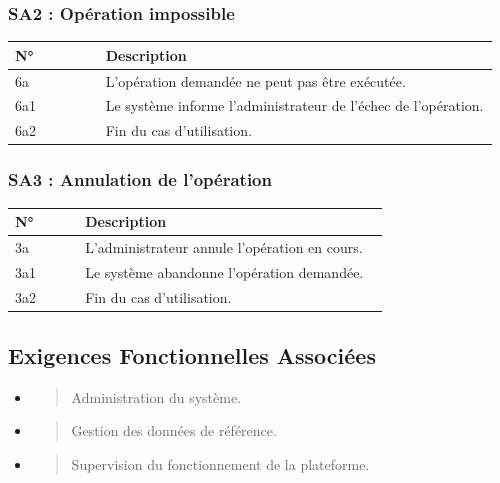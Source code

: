 \hypertarget{sa2-opuxe9ration-impossible}{%
\subsubsection{SA2 : Opération
impossible}\label{sa2-opuxe9ration-impossible}}

\begin{longtable}{@{}p{0.18\linewidth}p{0.78\linewidth}@{}}
\toprule
\rowcolors{2}{gray!10}{white}
\textbf{N°} & \textbf{Description} \\
\midrule
\endhead
6a & L'opération demandée ne peut pas être exécutée. \\
6a1 & Le système informe l'administrateur de l'échec de l'opération. \\
6a2 & Fin du cas d'utilisation. \\
\bottomrule
\end{longtable}

\hypertarget{sa3-annulation-de-lopuxe9ration-3}{%
\subsubsection{SA3 : Annulation de
l'opération}\label{sa3-annulation-de-lopuxe9ration-3}}

\begin{longtable}{@{}p{0.18\linewidth}p{0.78\linewidth}@{}}
\toprule
\rowcolors{2}{gray!10}{white}
\textbf{N°} & \textbf{Description} \\
\midrule
\endhead
3a & L'administrateur annule l'opération en cours. \\
3a1 & Le système abandonne l'opération demandée. \\
3a2 & Fin du cas d'utilisation. \\
\bottomrule
\end{longtable}

\hypertarget{exigences-fonctionnelles-associuxe9es-6}{%
\subsection{Exigences Fonctionnelles
Associées}\label{exigences-fonctionnelles-associuxe9es-6}}

\begin{itemize}
\item
  \begin{quote}
  Administration du système.
  \end{quote}
\item
  \begin{quote}
  Gestion des données de référence.
  \end{quote}
\item
  \begin{quote}
  Supervision du fonctionnement de la plateforme.
  \end{quote}
\end{itemize}

